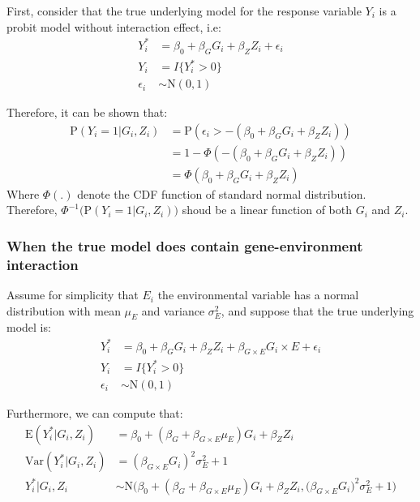 \documentclass[]{article}
\begin{document}
First, consider that the true underlying model for the response variable
\(Y_i\) is a probit model without interaction effect, i.e:
\begin{equation}\label{eqn:probitModel}
\begin{aligned}
Y_i^* &= \beta_0 + \beta_G G_i + \beta_Z Z_i + \epsilon_i \\
Y_i &= I\{Y_i^*>0\} \\
\epsilon_i &\sim \text{N}(0,1)
\end{aligned}
\end{equation}

Therefore, it can be shown that:
\begin{equation}\label{eqn:probitModelLinearity}
\begin{aligned}
\text{P}(Y_i = 1| G_i, Z_i) &= \text{P}(\epsilon_i > -(\beta_0 +\beta_G G_i + \beta_Z Z_i)) \\
&= 1 - \Phi(-(\beta_0 + \beta_G G_i + \beta_Z Z_i)) \\
&= \Phi(\beta_0 + \beta_G G_i + \beta_Z Z_i)
\end{aligned}
\end{equation} Where \(\Phi(.)\) denote the CDF function of standard
normal distribution. Therefore,
\(\Phi^{-1}\bigg(\text{P}(Y_i = 1|G_i,Z_i)\bigg)\) shoud be a linear
function of both \(G_i\) and \(Z_i\).

\hypertarget{when-the-true-model-does-contain-gene-environment-interaction}{%
\subsubsection{When the true model does contain gene-environment
interaction}\label{when-the-true-model-does-contain-gene-environment-interaction}}

Assume for simplicity that \(E_i\) the environmental variable has a
normal distribution with mean \(\mu_E\) and variance \(\sigma_E^2\), and
suppose that the true underlying model is:
\begin{equation}\label{eqn:probitModelWithInteraction}
\begin{aligned}
Y_i^* &= \beta_0 + \beta_G G_i + \beta_Z Z_i + \beta_{G\times E} G_i \times E + \epsilon_i \\
Y_i &= I\{Y_i^*>0\} \\
\epsilon_i &\sim \text{N}(0,1)
\end{aligned}
\end{equation}

Furthermore, we can compute that:
\begin{equation}\label{eqn:probitModelWithInteraction_MeanVar}
\begin{aligned}
\text{E}(Y_i^*|G_i,Z_i) &= \beta_0 + (\beta_G + \beta_{G\times E} \mu_E)G_i + \beta_Z Z_i \\
\text{Var}(Y_i^*|G_i,Z_i) &= (\beta_{G\times E} G_i)^2 \sigma_E^2 + 1 \\
Y_i^*|G_i, Z_i &\sim \text{N}\bigg(\beta_0 + (\beta_G + \beta_{G\times E} \mu_E)G_i + \beta_Z Z_i,  \big(\beta_{G\times E} G_i\big)^2 \sigma_E^2 + 1\bigg)
\end{aligned}
\end{equation}
\end{document}
